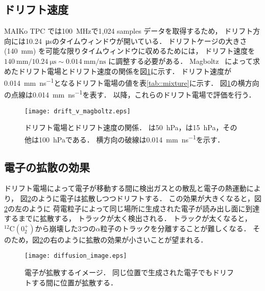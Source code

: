 \documentclass[../master]{subfiles}
\begin{document}
\subsection{ドリフト速度}
MAIKo TPC では\SI{100}{\mega\hertz}で1,024 samples データを取得するため，
ドリフト方向には\SI{10.24}{\micro\second}のタイムウィンドウが開いている．
ドリフトケージの大きさ (\SI{140}{\milli\metre}) を可能な限りタイムウィンドウに収めるためには，
ドリフト速度を$\SI{140}{\milli\metre}/\SI{10.24}{\micro\second} \sim \SI{0.014}{\milli\metre\per\nano\second}$
に調整する必要がある．
Magboltz~\cite{magboltz} によって求めたドリフト電場とドリフト速度の関係を図\ref{fig::drift_v_magboltz}に示す．
ドリフト速度が\SI{0.014}{\milli\metre\per\nano\second}となるドリフト電場の値を表\ref{tab::mixture}に示す．
図\ref{fig::drift_v_magboltz}の横方向の点線は\SI{0.014}{\milli\metre\per\nano\second}を表す．
以降，これらのドリフト電場で評価を行う．
\begin{figure}
  \centering
  \texttt{[image: drift\_v\_magboltz.eps]}
  \caption[ドリフト電場とドリフト速度の関係．]
          {ドリフト電場とドリフト速度の関係．
            \Methane は\SI{50}{\hecto\pascal}，\isoButane は\SI{15}{\hecto\pascal}，その他は\SI{100}{\hecto\pascal}である．
            横方向の破線は\SI{0.014}{\milli\metre\per\nano\second}を示す．}
          \label{fig::drift_v_magboltz}
\end{figure}

\subsection{電子の拡散の効果}
ドリフト電場によって電子が移動する間に検出ガスとの散乱と電子の熱運動により，
図\ref{fig::diffusion-image}のように電子は拡散しつつドリフトする．
この効果が大きくなると，図\ref{fig::diffusion-image}の左のように
荷電粒子によって同じ場所に生成された電子が読み出し面に到達するまでに拡散する，
トラックが太く検出される．
トラックが太くなると，${}^{12}\mathrm{C}(0_2^+)$から崩壊した3つの$\alpha$粒子のトラックを分離することが難しくなる．
そのため，図\ref{fig::diffusion-image}の右のように拡散の効果が小さいことが望まれる．
\begin{figure}
  \centering
  \texttt{[image: diffusion\_image.eps]}
  \caption[電子が拡散するイメージ．]
          {電子が拡散するイメージ．
          同じ位置で生成された電子でもドリフトする間に位置が拡散する．}
  \label{fig::diffusion-image}
\end{figure}
\end{document}

